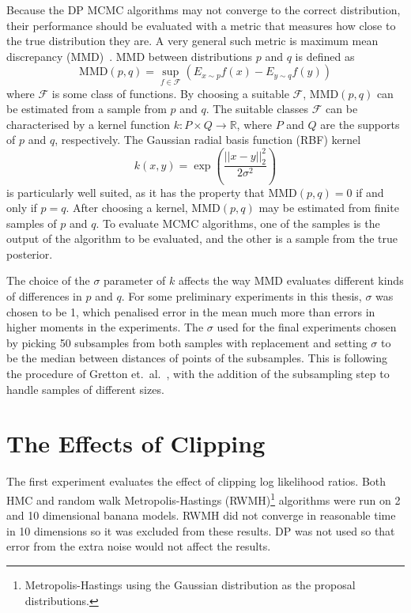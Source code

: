 \documentclass[english,twoside,openright]{HYgraduMLDS}
\newcommand{\R}{\mathbb{R}}
\begin{document}
Because the DP MCMC algorithms may not converge to the correct distribution, 
their performance should be evaluated with a metric that measures how close 
to the true distribution they are. A very general such metric is maximum mean
discrepancy (MMD)~\cite{GrettonBRSS12}. MMD between distributions \(p\) and \(q\) 
is defined as 
\[
    \mathrm{MMD}(p, q) = \sup_{f\in \mathcal{F}}(E_{x\sim p}f(x) - E_{y\sim q}f(y))
\]
where \(\mathcal{F}\) is some class of functions. By 
choosing a suitable \(\mathcal{F}\), \(\mathrm{MMD}(p, q)\) can be estimated from a 
sample from \(p\) and \(q\). The suitable classes \(\mathcal{F}\) can be 
characterised by a kernel function \(k\colon P\times Q \to \R\), where 
\(P\) and \(Q\) are the supports of \(p\) and \(q\), respectively.
The Gaussian radial basis function (RBF) kernel 
\[
    k(x, y) = \exp\left(\frac{||x - y||_2^2}{2\sigma^2}\right)
\]
is particularly well suited, as it has the property that 
\(\mathrm{MMD}(p, q) = 0\) if and only if \(p = q\). After choosing a kernel,
\(\mathrm{MMD}(p, q)\) may be estimated from finite samples of \(p\) and \(q\).
To evaluate MCMC algorithms, one of the samples is the output of the algorithm 
to be evaluated, and the other is a sample from the true posterior.

The choice of the \(\sigma\) parameter of \(k\) affects the way MMD evaluates 
different kinds of differences in \(p\) and \(q\). For some preliminary experiments
in this thesis, \(\sigma\) was chosen to be 1, which penalised error in the 
mean much more than errors in higher moments in the experiments. 
The \(\sigma\) used for the final experiments chosen by picking 50 subsamples 
from both samples with replacement and setting \(\sigma\) to be the median 
between distances of points of the subsamples. This is following the procedure of 
Gretton et.\ al.~\cite{GrettonBRSS12}, with the addition of the subsampling step 
to handle samples of different sizes.

\section{The Effects of Clipping}\label{clipping_experiments}

The first experiment evaluates the effect of clipping log likelihood ratios.
Both HMC and random walk Metropolis-Hastings (RWMH)\footnote{Metropolis-Hastings using the Gaussian
distribution as the proposal distributions.}
algorithms were run on 2 and 10 dimensional banana models. RWMH did not 
converge in reasonable time in 10 dimensions so it was excluded from these results.
DP was not used so that error from the extra noise would not affect the results.
\end{document}
